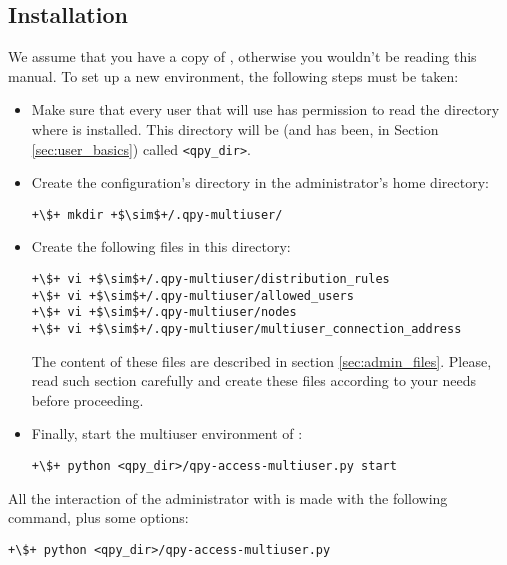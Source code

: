 \documentclass[a4paper,12pt]{article}
\begin{document}
\subsection{Installation}\label{sec:instal_admin}

We assume that you have a copy of \qpy{}, otherwise you wouldn't be reading this manual.
To set up a new \qpy{} environment, the following steps must be taken:

\begin{itemize}
\item Make sure that every user that will use \qpy{} has permission to read the directory where \qpy{} is installed.
This directory will be (and has been, in Section \ref{sec:user_basics}) called \texttt{<qpy\_dir>}.

\item Create the configuration's directory in the administrator's home directory:

\begin{lstlisting}[style=BashStyle]
+\$+ mkdir +$\sim$+/.qpy-multiuser/
\end{lstlisting}

\item Create the following files in this directory:

\begin{lstlisting}[style=BashStyle]
+\$+ vi +$\sim$+/.qpy-multiuser/distribution_rules
+\$+ vi +$\sim$+/.qpy-multiuser/allowed_users
+\$+ vi +$\sim$+/.qpy-multiuser/nodes
+\$+ vi +$\sim$+/.qpy-multiuser/multiuser_connection_address
\end{lstlisting}

The content of these files are described in section \ref{sec:admin_files}.
Please, read such section carefully and create these files according to your needs before proceeding.

\item Finally, start the multiuser environment of \qpy{}:

\begin{lstlisting}[style=BashStyle]
+\$+ python <qpy_dir>/qpy-access-multiuser.py start
\end{lstlisting}

\end{itemize}

All the interaction of the administrator with \qpy{} is made with the following command, plus some options:

\begin{lstlisting}[style=BashStyle]
+\$+ python <qpy_dir>/qpy-access-multiuser.py 
\end{lstlisting}
\end{document}
